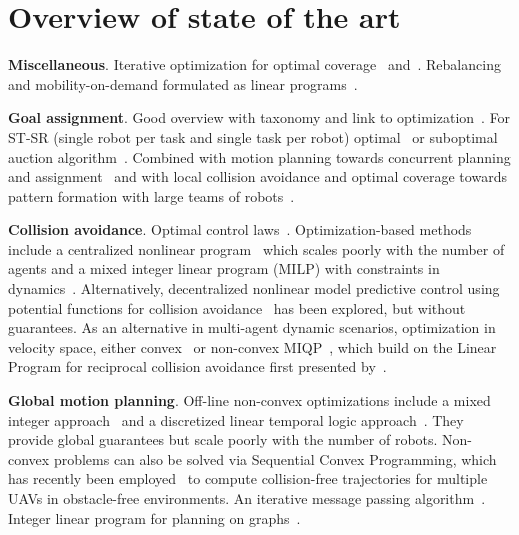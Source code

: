 
\section{Overview of state of the art}\label{sec:4}

\textbf{Miscellaneous}. 
Iterative optimization for optimal coverage~\cite{cortes04} and~\cite{Schwager:2009fz}. Rebalancing and mobility-on-demand formulated as linear programs~\cite{Smith:2013fa}.

\textbf{Goal assignment}.
Good overview with taxonomy and link to optimization~\cite{Gerkey:2004il}. For ST-SR (single robot per task and single task per robot) optimal~\cite{kuhn55} or suboptimal auction algorithm~\cite{Bertsekas:1992wx}.
Combined with motion planning towards concurrent planning and assignment~\cite{Turpin:2014bu} and with local collision avoidance and optimal coverage towards pattern formation with large teams of robots~\cite{alonsomora12ijrr}.

\textbf{Collision avoidance}.
Optimal control laws~\cite{Hoffmann:2008vl}. Optimization-based methods include a centralized nonlinear program~\cite{Raghunathan:2004ga} which scales poorly with the number of agents and a mixed integer linear program (MILP) with constraints in dynamics~\cite{Kuwata:2007vq}.
 Alternatively, decentralized nonlinear model predictive control using potential functions for collision avoidance~\cite{Shim:2003ih} has been explored, but without guarantees.
As an alternative in multi-agent dynamic scenarios, optimization in velocity space, either convex~\cite{snape09, AlonsoMora:2014kb, alonsomora2015auro} or non-convex MIQP~\cite{alonsomora13icra}, which build on the Linear Program for reciprocal collision avoidance first presented by~\cite{vandenberg09}.

\textbf{Global motion planning}.
Off-line non-convex optimizations include a mixed integer approach~\cite{Mellinger:2012fi, Kushleyev:2012wy} and a discretized linear temporal logic approach~\cite{Saha:2014vi}. They provide global guarantees but scale poorly with the number of robots. 
Non-convex problems can also be solved via Sequential Convex Programming, which has recently been employed~\cite{augugliaro12} to compute collision-free trajectories for multiple UAVs in obstacle-free environments. An iterative message passing algorithm~\cite{Bento:2013td}. Integer linear program for planning on graphs~\cite{Yu:2013ij}.

